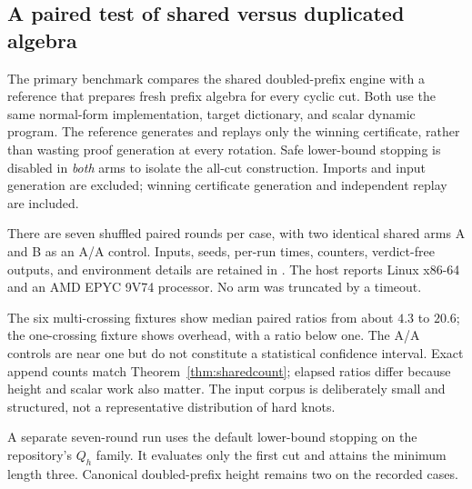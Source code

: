 \documentclass[11pt,a4paper]{article}
\theoremstyle{definition}\newtheorem{definition}[theorem]{Definition}
\theoremstyle{remark}\newtheorem{remark}[theorem]{Remark}
\newcommand{\code}[1]{\texttt{\detokenize{#1}}}
\begin{document}
\subsection{A paired test of shared versus duplicated algebra}
The primary benchmark compares the shared doubled-prefix engine with a
reference that prepares fresh prefix algebra for every cyclic cut. Both
use the same normal-form implementation, target dictionary, and scalar
dynamic program. The reference generates and replays only the winning
certificate, rather than wasting proof generation at every rotation.
Safe lower-bound stopping is disabled in \emph{both} arms to isolate the
all-cut construction. Imports and input generation are excluded; winning
certificate generation and independent replay are included.

There are seven shuffled paired rounds per case, with two identical shared
arms A and B as an A/A control. Inputs, seeds, per-run times, counters,
verdict-free outputs, and environment details are retained in
\code{data/benchmarks.json}. The host reports Linux x86-64 and an AMD EPYC
9V74 processor. No arm was truncated by a timeout.

\begin{table}[ht]\centering\small

\caption{Compressor-level all-cut measurements. Times are median milliseconds;
Ratio is the median paired naive/shared-A ratio; A/A is the median paired
shared-B/shared-A ratio. These are not complete-recognizer timings.}
\end{table}

The six multi-crossing fixtures show median paired ratios from about
$4.3$ to $20.6$; the one-crossing fixture shows overhead, with a ratio below
one. The A/A controls are near one but do not constitute a statistical
confidence interval. Exact append counts match
Theorem~\ref{thm:sharedcount}; elapsed ratios differ because height and scalar
work also matter. The input corpus is deliberately small and structured,
not a representative distribution of hard knots.

A separate seven-round run uses the default lower-bound stopping on the
repository's $Q_h$ family. It evaluates only the first cut and attains the
minimum length three. Canonical doubled-prefix height remains two on the
recorded cases.

\begin{table}[ht]\centering\small

\caption{Certified radius-one kernel on $Q_h$, with the exact lower-bound
shortcut enabled. Certificate sizes are compact JSON bytes. The separate
whole-word candidate is not included in these kernel timings.}
\end{table}
\end{document}
